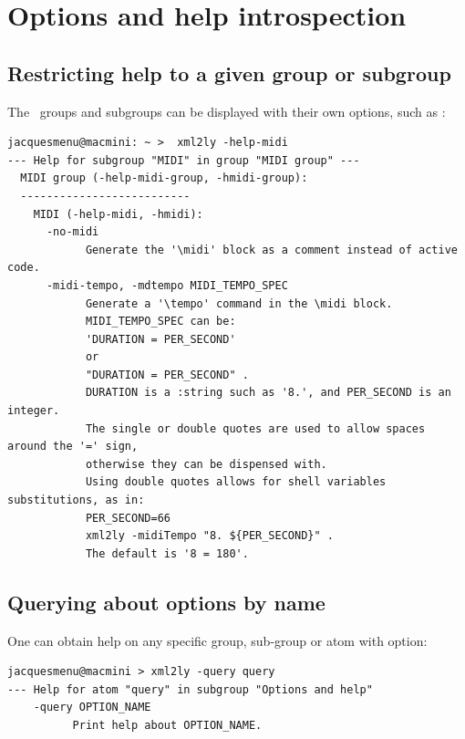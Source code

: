 \chapter{Options and help introspection}

\section{Restricting help to a given group or subgroup}

The \oahRepr\ groups and subgroups can be displayed with their own options, such as :
\begin{lstlisting}[language=Terminal]
jacquesmenu@macmini: ~ >  xml2ly -help-midi
--- Help for subgroup "MIDI" in group "MIDI group" ---
  MIDI group (-help-midi-group, -hmidi-group):
  --------------------------
    MIDI (-help-midi, -hmidi):
      -no-midi
            Generate the '\midi' block as a comment instead of active code.
      -midi-tempo, -mdtempo MIDI_TEMPO_SPEC
            Generate a '\tempo' command in the \midi block.
            MIDI_TEMPO_SPEC can be:
            'DURATION = PER_SECOND'
            or
            "DURATION = PER_SECOND" .
            DURATION is a :string such as '8.', and PER_SECOND is an integer.
            The single or double quotes are used to allow spaces around the '=' sign,
            otherwise they can be dispensed with.
            Using double quotes allows for shell variables substitutions, as in:
            PER_SECOND=66
            xml2ly -midiTempo "8. ${PER_SECOND}" .
            The default is '8 = 180'.
\end{lstlisting}


\section{Querying about options by name}\label{Querying about options by name}

One can obtain help on any specific group, sub-group or atom with  option:
\begin{lstlisting}[language=Terminal]
jacquesmenu@macmini > xml2ly -query query
--- Help for atom "query" in subgroup "Options and help"
    -query OPTION_NAME
          Print help about OPTION_NAME.
\end{lstlisting}

